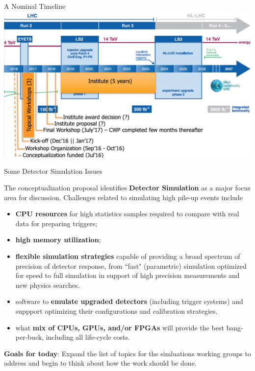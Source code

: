 \documentclass[compress,10]{beamer}
\begin{document}
\begin{frame}{A Nominal Timeline}{}
{\footnotesize
\includegraphics[width=1.0\textwidth]{S2I2_timeline.png}
}  %

\end{frame}
\begin{frame}{Some Detector Simulation Issues}{}
{\footnotesize
The conceptualization proposal identifies \textcolor{brickred}{\bf
Detector Simulation} as a major focus area for discussion.
Challenges related to simulating high pile-up events include
\begin{itemize}
 \item
   \textcolor{brickred}{\bf CPU resources}
    for high statistics samples required to compare with
   real data for preparing triggers;
 \item
   \textcolor{brickred}{\bf high memory utilization};
 \item
   \textcolor{brickred}{\bf
   flexible simulation strategies} capable of providing a broad spectrum
   of precision of detector response, from ``fast" (parametric) simulation
   optimized for speed to full simulation in support of high precision
   measurements and new physics searches.
  \item
   software to \textcolor{brickred}{\bf emulate upgraded detectors}
   (including trigger systems) and
   suppport optimizing their configurations and calibration strategies.
  \item
   what \textcolor{brickred}{\bf mix of CPUs, GPUs, and/or FPGAs}
   will provide the 
   best bang-per-buck, including all life-cycle costs.
\end{itemize}
\vskip 0.1in
\noindent
\textcolor{brickred}{\bf Goals for today}:
Expand the list of topics for the simluations working groups to 
address and begin to think about how the work should be done.


}  %

\end{frame}
\end{document}
